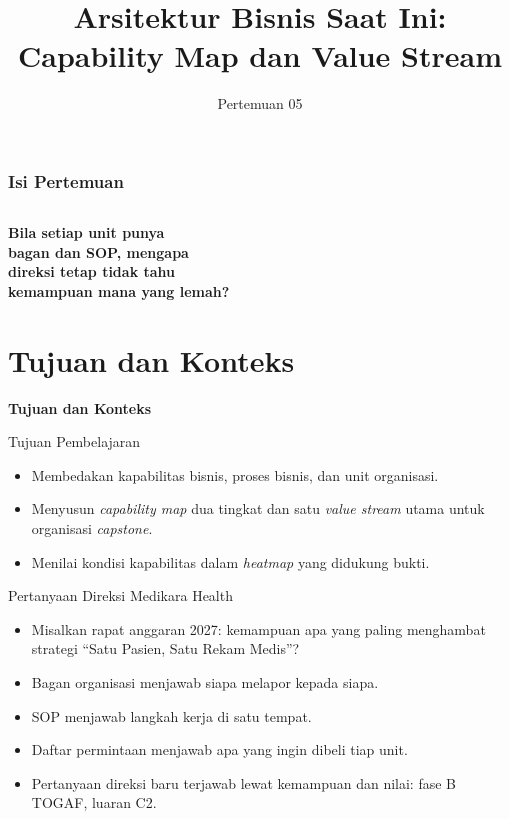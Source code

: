 \documentclass[aspectratio=169, table, 12pt]{beamer}
\title{\Huge Arsitektur Bisnis Saat Ini:\\ \vspace{10pt} Capability Map dan Value Stream}
\date{Pertemuan 05}
\begin{document}
\begin{frame}
  \titlepage
\end{frame}

\begin{frame}
  \frametitle{Isi Pertemuan}
  \vspace{14pt}
  \begin{columns}[t]
    {\small\tableofcontents[sections={1-3}]}

    {\small\tableofcontents[sections={4-6}]}
  \end{columns}
\end{frame}

\begin{frame}{\hfill}
  \centering
  \Huge{\textbf{Bila setiap unit punya\\bagan dan SOP, mengapa\\direksi tetap tidak tahu\\kemampuan mana yang lemah?}}
\end{frame}

\section{Tujuan dan Konteks}

\begin{frame}{\hfill}
  \centering
  \Huge{\textbf{Tujuan dan Konteks}}
\end{frame}

\begin{frame}{{\Large Tujuan Pembelajaran}}
  \vspace{10pt}
  \begin{itemize}
    \item Membedakan kapabilitas bisnis, proses bisnis, dan unit organisasi.
    \item Menyusun \textit{capability map} dua tingkat dan satu \textit{value stream} utama untuk
          organisasi \textit{capstone}.
    \item Menilai kondisi kapabilitas dalam \textit{heatmap} yang didukung bukti.
  \end{itemize}
\end{frame}

\begin{frame}{{\Large Pertanyaan Direksi Medikara Health}}
  \vspace{10pt}
  \begin{itemize}
    \item Misalkan rapat anggaran 2027: kemampuan apa yang paling menghambat strategi ``Satu
          Pasien, Satu Rekam Medis''?
    \item Bagan organisasi menjawab siapa melapor kepada siapa.
    \item SOP menjawab langkah kerja di satu tempat.
    \item Daftar permintaan menjawab apa yang ingin dibeli tiap unit.
    \item Pertanyaan direksi baru terjawab lewat kemampuan dan nilai: fase B TOGAF, luaran C2.
  \end{itemize}
\end{frame}
\end{document}
